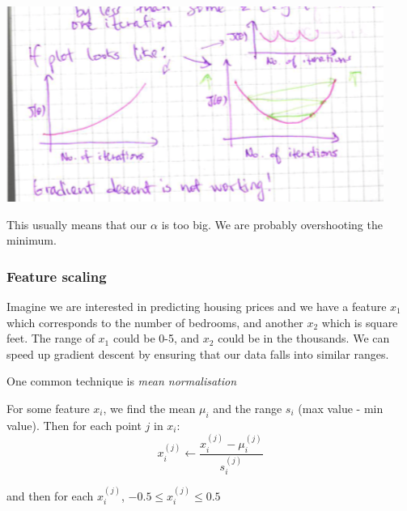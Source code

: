 \documentclass[12pt]{article}
\begin{document}
\includegraphics[width={\textwidth}]{not-working}

This usually means that our $\alpha$ is too big. We are probably overshooting the minimum. 

\subsubsection{Feature scaling}

Imagine we are interested in predicting housing prices and we have a feature $x_1$ which corresponds to the number of bedrooms, and another $x_2$ which is square feet. The range of $x_1$ could be 0-5, and $x_2$ could be in the thousands. We can speed up gradient descent by ensuring that our data falls into similar ranges. 

One common technique is \textit{mean normalisation} 

For some feature $x_i$, we find the mean $\mu_i$ and the range $s_i$ (max value - min value). Then for each point $j$ in $x_i$:
\[
x_i^{(j)} \leftarrow \frac{x_i^{(j)} - \mu_i^{(j)}}{s_i^{(j)}}
\]

and then for each $x_i^{(j)} $, $-0.5 \leq x_i^{(j)}  \leq 0.5$
\end{document}
